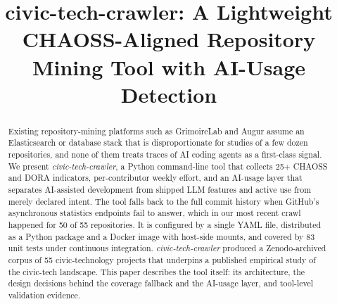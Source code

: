 \documentclass[10pt,conference]{IEEEtran}
\newcommand{\tool}{\textit{civic-tech-crawler}}
\begin{document}
\title{civic-tech-crawler: A Lightweight CHAOSS-Aligned Repository Mining Tool with AI-Usage Detection}

\author{%
  \and
  \and
  \and
}

\maketitle

\begin{abstract}
Existing repository-mining platforms such as GrimoireLab and Augur assume an Elasticsearch or database stack that is disproportionate for studies of a few dozen repositories, and none of them treats traces of AI coding agents as a first-class signal. We present \tool{}, a Python command-line tool that collects 25+ CHAOSS and DORA indicators, per-contributor weekly effort, and an AI-usage layer that separates AI-assisted development from shipped LLM features and active use from merely declared intent. The tool falls back to the full commit history when GitHub's asynchronous statistics endpoints fail to answer, which in our most recent crawl happened for 50 of 55 repositories. It is configured by a single YAML file, distributed as a Python package and a Docker image with host-side mounts, and covered by 83 unit tests under continuous integration. \tool{} produced a Zenodo-archived corpus of 55 civic-technology projects that underpins a published empirical study of the civic-tech landscape. This paper describes the tool itself: its architecture, the design decisions behind the coverage fallback and the AI-usage layer, and tool-level validation evidence.
\end{abstract}
\end{document}
